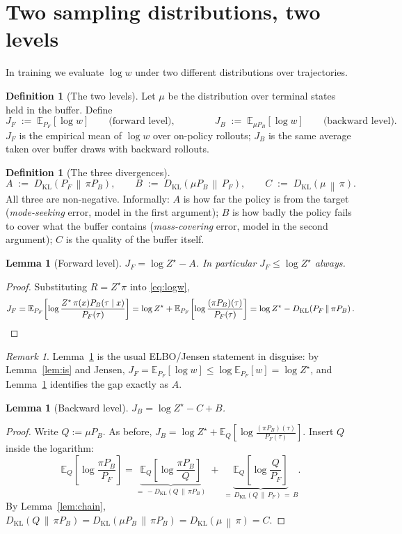 \documentclass[11pt]{article}
\theoremstyle{plain}
\newtheorem{lemma}[theorem]{Lemma}
\theoremstyle{definition}
\newtheorem{definition}[theorem]{Definition}
\theoremstyle{remark}
\newtheorem{remark}[theorem]{Remark}
\newcommand{\KL}[2]{D_{\mathrm{KL}}\!\left(#1 \,\middle\|\, #2\right)}
\newcommand{\E}[2]{\mathbb{E}_{#1}\!\left[#2\right]}
\newcommand{\PF}{P_{F}}
\newcommand{\PB}{P_{B}}
\newcommand{\Zstar}{Z^{\star}}
\newcommand{\JF}{J_{F}}
\newcommand{\JB}{J_{B}}
\begin{document}
\section{Two sampling distributions, two levels}

In training we evaluate $\log w$ under two different distributions over
trajectories.

\begin{definition}[The two levels]
Let $\mu$ be the distribution over terminal states held in the buffer. Define
\[
  \JF \;:=\; \E{\PF}{\log w}
  \qquad\text{(forward level)},
  \qquad\qquad
  \JB \;:=\; \E{\mu\PB}{\log w}
  \qquad\text{(backward level)} .
\]
$\JF$ is the empirical mean of $\log w$ over on-policy rollouts; $\JB$ is the
same average taken over buffer draws with backward rollouts.
\end{definition}

\begin{definition}[The three divergences]\label{def:abc}
\[
  A \;:=\; \KL{\PF}{\pi\PB},
  \qquad
  B \;:=\; \KL{\mu\PB}{\PF},
  \qquad
  C \;:=\; \KL{\mu}{\pi}.
\]
All three are non-negative. Informally: $A$ is how far the policy is from the
target (\emph{mode-seeking} error, model in the first argument); $B$ is how badly
the policy fails to cover what the buffer contains (\emph{mass-covering} error,
model in the second argument); $C$ is the quality of the buffer itself.
\end{definition}

\begin{lemma}[Forward level]\label{lem:JF}
$\JF = \log \Zstar - A$. In particular $\JF \le \log\Zstar$ always.
\end{lemma}
\begin{proof}
Substituting $R = \Zstar\pi$ into \eqref{eq:logw},
\[
  \JF = \E{\PF}{\log \frac{\Zstar\,\pi(x)\PB(\tau\mid x)}{\PF(\tau)}}
      = \log\Zstar + \E{\PF}{\log\frac{(\pi\PB)(\tau)}{\PF(\tau)}}
      = \log\Zstar - \KL{\PF}{\pi\PB}. \qedhere
\]
\end{proof}

\begin{remark}
Lemma~\ref{lem:JF} is the usual ELBO/Jensen statement in disguise: by
Lemma~\ref{lem:is} and Jensen, $\JF = \E{\PF}{\log w} \le \log \E{\PF}{w} = \log\Zstar$,
and Lemma~\ref{lem:JF} identifies the gap exactly as $A$.
\end{remark}

\begin{lemma}[Backward level]\label{lem:JB}
$\JB = \log\Zstar - C + B$.
\end{lemma}
\begin{proof}
Write $Q := \mu\PB$. As before,
$\JB = \log\Zstar + \E{Q}{\log\frac{(\pi\PB)(\tau)}{\PF(\tau)}}$.
Insert $Q$ inside the logarithm:
\[
  \E{Q}{\log\frac{\pi\PB}{\PF}}
  = \underbrace{\E{Q}{\log\frac{\pi\PB}{Q}}}_{=\,-\KL{Q}{\pi\PB}}
  \;+\; \underbrace{\E{Q}{\log\frac{Q}{\PF}}}_{=\,\KL{Q}{\PF}\,=\,B}.
\]
By Lemma~\ref{lem:chain}, $\KL{Q}{\pi\PB} = \KL{\mu\PB}{\pi\PB} = \KL{\mu}{\pi} = C$.
\end{proof}
\end{document}
